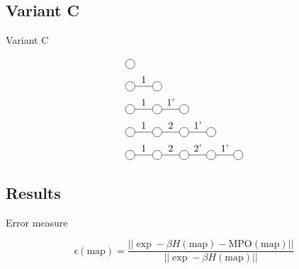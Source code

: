 \documentclass[aspectratio=169]{beamer}
\begin{document}
\subsection{Variant C}
\begin{frame}{Variant C}

    \begin{equation}
        \begin{split}
            &\mpob{1}{ {,}  }{}{}{}{{,,}} \\
            &\mpob{2}{ {,"1",}  }{}{}{}{{,,}}\\
            &\mpob{3}{ {,"1","1'",}  }{}{}{}{{,,,}}\\
            &\mpob{4}{ {,"1","2","1'",}  }{}{}{}{{,,,,,}}\\
            &\mpob{5}{ {,"1","2","2'","1'",}  }{}{}{}{{,,,,,}}\\
        \end{split}
    \end{equation}

\end{frame}


\subsection{Results}
\begin{frame}{Error measure}

    \begin{equation}
        \epsilon(\text{map}) = \frac{|| \exp -\beta H( \text{map} ) - \text{MPO}(\text{map}) || }{|| \exp -\beta H(\text{map}) || }
    \end{equation}

\end{frame}
\end{document}
